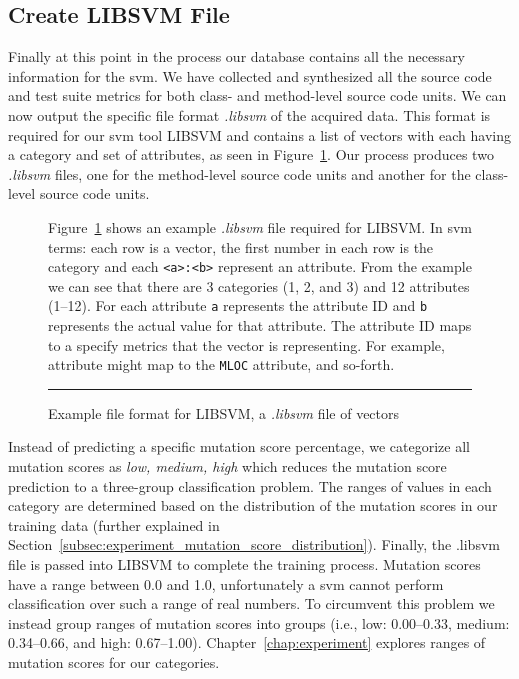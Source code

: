 \subsection{Create LIBSVM File}
\label{subsec:approach_create_libsvm_file}
Finally at this point in the process our database contains all the necessary information for the \gls{svm}. We have collected and synthesized all the source code and test suite metrics for both class- and method-level source code units. We can now output the specific file format \emph{.libsvm} of the acquired data. This format is required for our \gls{svm} tool LIBSVM and contains a list of vectors with each having a category and set of attributes, as seen in Figure~\ref{fig:libsvm_file}. Our process produces two \emph{.libsvm} files, one for the method-level source code units and another for the class-level source code units.

\begin{figure}[h]
  \centering
  \begin{minipage}{9.5cm}
    
  \end{minipage}
  \caption{Example file format for LIBSVM, a \emph{.libsvm} file of vectors}
  \vspace{1mm}
  \footnotesize{Figure~\ref{fig:libsvm_file} shows an example \emph{.libsvm} file required for LIBSVM. In \gls{svm} terms: each row is a vector, the first number in each row is the category and each \texttt{<a>:<b>} represent an attribute. From the example we can see that there are 3 categories (1, 2, and 3) and 12 attributes (1--12). For each attribute \texttt{a} represents the attribute ID and \texttt{b} represents the actual value for that attribute. The attribute ID maps to a specify metrics that the vector is representing. For example, attribute  might map to the \texttt{MLOC} attribute, and so-forth.}
  \vspace{2mm}
  \hrule
  \label{fig:libsvm_file}
\end{figure}


Instead of predicting a specific mutation score percentage, we categorize all mutation scores as \textit{low, medium, high} which reduces the mutation score prediction to a three-group classification problem. The ranges of values in each category are determined based on the distribution of the mutation scores in our training data (further explained in Section~\ref{subsec:experiment_mutation_score_distribution}). Finally, the .libsvm file is passed into LIBSVM to complete the training process. Mutation scores have a range between 0.0 and 1.0, unfortunately a \gls{svm} cannot perform classification over such a range of real numbers. To circumvent this problem we instead group ranges of mutation scores into groups (i.e., low: 0.00--0.33, medium: 0.34--0.66, and high: 0.67--1.00). Chapter~\ref{chap:experiment} explores ranges of mutation scores for our categories.


